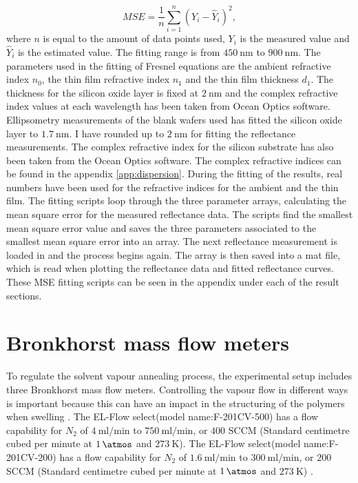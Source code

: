 \documentclass[MasterThesisMain.tex]{subfiles}
\begin{document}
\begin{equation}
MSE = \frac{1}{n}\sum_{i=1}^{n}\left( Y_i - \hat{Y}_i \right)^2,
\end{equation} 
where $n$ is equal to the amount of data points used, $Y_i$ is the measured value and $\hat{Y}_i$ is the estimated value. The fitting range is from $\SI{450}{\nano\meter}$ to $\SI{900}{\nano\meter}$. The parameters used in the fitting of Fresnel equations are the ambient refractive index $n_0$, the thin film refractive index $n_1$ and the thin film thickness $d_1$. The thickness for the silicon oxide layer is fixed at $\SI{2}{\nano\meter}$ and the complex refractive index values at each wavelength has been taken from Ocean Optics software. Ellipsometry measurements of the blank wafers used has fitted the silicon oxide layer to $\SI{1.7}{\nano\meter}$. I have rounded up to $\SI{2}{\nano\meter}$ for fitting the reflectance measurements. The complex refractive index for the silicon substrate has also been taken from the Ocean Optics software. The complex refractive indices can be found in the appendix \ref{app:dispersion}. During the fitting of the results, real numbers have been used for the refractive indices for the ambient and the thin film. The fitting scripts loop through the three parameter arrays, calculating the mean square error for the measured reflectance data. The scripts find the smallest mean square error value and saves the three parameters associated to the smallest mean square error into an array. The next reflectance measurement is loaded in and the process begins again. The array is then saved into a mat file, which is read when plotting the reflectance data and fitted reflectance curves. These MSE fitting scripts can be seen in the appendix under each of the result sections.

\section{Bronkhorst mass flow meters}
To regulate the solvent vapour annealing process, the experimental setup includes three Bronkhorst mass flow meters. Controlling the vapour flow in different ways is important because this can have an impact in the structuring of the polymers when swelling \cite{SVABCP}. The EL-Flow select(model name:F-201CV-500) has a flow capability for $N_2$ of $\SI{4}{\milli\litre\per\minute}$ to $\SI{750}{\milli\litre\per\minute}$, or $400$ SCCM (Standard centimetre cubed per minute at $\SI{1}{\atmos}$ and $\SI{273}{\kelvin}$). The EL-Flow select(model name:F-201CV-200) has a flow capability for $N_2$ of $\SI{1.6}{\milli\litre\per\minute}$ to $\SI{300}{\milli\litre\per\minute}$, or $200$ SCCM (Standard centimetre cubed per minute at $\SI{1}{\atmos}$ and $\SI{273}{\kelvin}$) \cite{elflow}.
\end{document}
